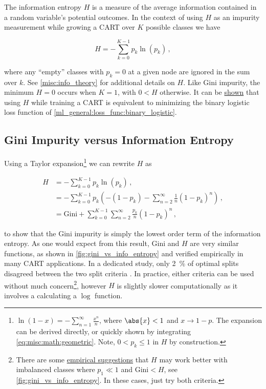 The information entropy $H$ is a measure of the average
information contained in a random variable's potential outcomes.
In the context of using $H$ as an impurity measurement while growing a CART
over $K$ possible classes we have

\begin{equation} \label{eq:info_entropy_cart}
H = -\sum_{k=0}^{K-1} p_{k} \ln\left(p_{k}\right) \, ,
\end{equation}

\noindent where any ``empty'' classes with $p_{k}=0$
at a given node are ignored in the sum over $k$.
See \cref{misc:info_theory} for additional details on $H$.
Like Gini impurity, the minimum $H = 0$ occurs when $K=1$, with $0 < H$ otherwise.
It can be \href{https://scikit-learn.org/stable/modules/tree.html#classification-criteria}{shown} \cite{sklearn}
that using $H$ while training a CART is equivalent to minimizing
the binary logistic loss function of \cref{ml_general:loss_func:binary_logistic}.

\subsection{Gini Impurity versus Information Entropy}
\label{class:CART:gini_vs_info_entropy}

Using a Taylor expansion\footnote{$\ln\left(1-x\right) = -\sum_{n=1}^{\infty} \frac{x^{n}}{n}$,
where $\abs{x} < 1$ and $x \to 1-p$.
The expansion can be derived directly,
or quickly shown by integrating \cref{eq:misc:math:geometric}.
Note, $0 < p_{k} \leq 1$ in $H$ by construction.} we can rewrite $H$ as

\begin{equation} \label{eq:info_entropy_expanded}
\begin{aligned}
H &= -\sum_{k=0}^{K-1} p_{k} \ln\left(p_{k}\right)\, , \\
&= -\sum_{k=0}^{K-1} p_{k} \left(
-\left(1-p_{k}\right)
-\sum_{n=2}^{\infty} \frac{1}{n}\left(1-p_{k}\right)^{n} \right)\, , \\
&= \text{Gini} + \sum_{k=0}^{K-1} \sum_{n=2}^{\infty} \frac{p_{k}}{n} \left(1-p_{k}\right)^{n}\, ,
\end{aligned}
\end{equation}

\noindent to show that the Gini impurity is simply the lowest order term of the information entropy.
As one would expect from this result,
$\text{Gini}$ and $H$ are very similar functions,
as shown in \cref{fig:gini_vs_info_entropy}
and verified empirically in many CART applications.
In a dedicated study, only \SI{2}{\percent} of optimal splits
disagreed between the two split criteria \cite{Raileanu2004}.
In practice, either criteria can be used without much concern\footnote{There
are some \href{https://ekamperi.github.io/machine\%20learning/2021/04/13/gini-index-vs-entropy-decision-trees.html}{empirical suggestions} that
$H$ may work better with imbalanced classes where $p_{1} \ll 1$ and $\text{Gini} < H$,
see \cref{fig:gini_vs_info_entropy}.
In these cases, just try both criteria.},
however $H$ is slightly slower computationally
as it involves a calculating a $\log$ function.

